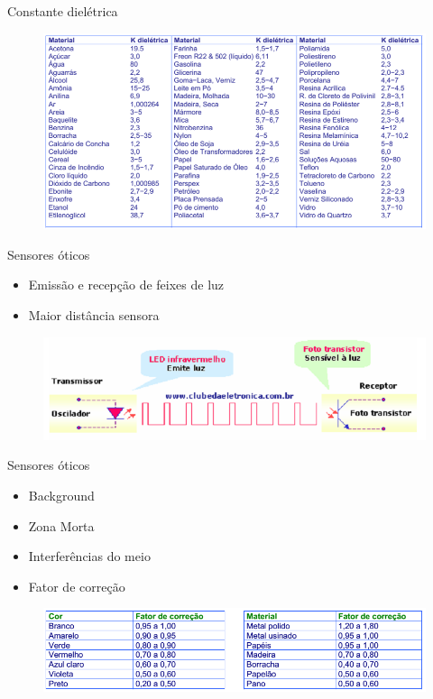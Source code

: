 \documentclass[aspectratio=169,
				xcolor=table]{beamer}
\begin{document}
		\begin{frame}{Constante dielétrica}
			\begin{figure}
				\centering	
				\includegraphics[scale=.45]{../figs/cap03/Imagem24}
			\end{figure}	
		\end{frame}		
	
		\begin{frame}{Sensores óticos}
			\begin{itemize}
				\item Emissão e recepção de feixes de luz 
				\vspace{0.8cm}
				\item Maior distância sensora
			\end{itemize}
			\begin{figure}
				\centering	
				\includegraphics[scale=.5]{../figs/cap03/Imagem25}
			\end{figure}	
		\end{frame}
		
		\begin{frame}{Sensores óticos}
			\begin{itemize}
				\item Background
				\vspace{0.5cm}
				\item Zona Morta
				\vspace{0.5cm}
				\item Interferências do meio
				\vspace{0.5cm}
				\item Fator de correção
			\end{itemize}
			\begin{figure}
				\centering	
				\includegraphics[scale=.5]{../figs/cap03/Imagem26}
			\end{figure}	
		\end{frame}
		
\end{document}
